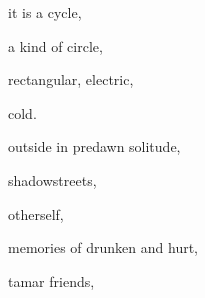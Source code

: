 \documentclass[extrafontsizes, 48pt]{memoir}
\newcommand\blankpage{%
    \null
    \thispagestyle{empty}%
    \addtocounter{page}{-1}%
    \newpage}
\begin{document}
	\begin{minipage}{.6\textwidth}
	it is a cycle,
	\end{minipage}
	\newpage

	\begin{minipage}{.6\textwidth}
	a kind of circle,
	\end{minipage}
	\newpage

	\begin{minipage}{.6\textwidth}
	rectangular, electric,
	\end{minipage}
	\newpage

	\begin{minipage}{.6\textwidth}
	cold.
	\afterpage{\blankpage}
	\end{minipage}
	\newpage

	\begin{minipage}{.6\textwidth}
	outside in predawn solitude,
	\end{minipage}
	\newpage

	\begin{minipage}{.6\textwidth}
	shadowstreets,
	\end{minipage}
	\newpage

	\begin{minipage}{.6\textwidth}
	otherself,
	\end{minipage}
	\newpage

	\begin{minipage}{.6\textwidth}
	memories of drunken and hurt,
	\end{minipage}
	\newpage

	\begin{minipage}{.6\textwidth}
	tamar friends,
	\end{minipage}
	\newpage
\end{document}
